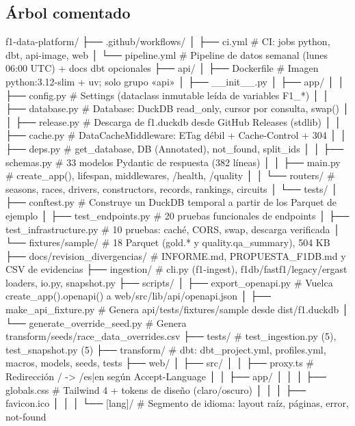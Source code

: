 \subsection{Árbol comentado}

\begin{codigo}
f1-data-platform/
├── .github/workflows/
│   ├── ci.yml                 # CI: jobs python, dbt, api-image, web
│   └── pipeline.yml           # Pipeline de datos semanal (lunes 06:00 UTC) + docs dbt opcionales
├── api/
│   ├── Dockerfile             # Imagen python:3.12-slim + uv; solo grupo «api»
│   ├── __init__.py
│   ├── app/
│   │   ├── config.py          # Settings (dataclass inmutable leída de variables F1_*)
│   │   ├── database.py        # Database: DuckDB read_only, cursor por consulta, swap()
│   │   ├── release.py         # Descarga de f1.duckdb desde GitHub Releases (stdlib)
│   │   ├── cache.py           # DataCacheMiddleware: ETag débil + Cache-Control + 304
│   │   ├── deps.py            # get_database, DB (Annotated), not_found, split_ids
│   │   ├── schemas.py         # 33 modelos Pydantic de respuesta (382 líneas)
│   │   ├── main.py            # create_app(), lifespan, middlewares, /health, /quality
│   │   └── routers/           # seasons, races, drivers, constructors, records, rankings, circuits
│   └── tests/
│       ├── conftest.py        # Construye un DuckDB temporal a partir de los Parquet de ejemplo
│       ├── test_endpoints.py  # 20 pruebas funcionales de endpoints
│       ├── test_infrastructure.py  # 10 pruebas: caché, CORS, swap, descarga verificada
│       └── fixtures/sample/   # 18 Parquet (gold.* y quality.qa_summary), 504 KB
├── docs/revision_divergencias/  # INFORME.md, PROPUESTA_F1DB.md y CSV de evidencias
├── ingestion/                 # cli.py (f1-ingest), f1db/fastf1/legacy/ergast loaders, io.py, snapshot.py
├── scripts/
│   ├── export_openapi.py      # Vuelca create_app().openapi() a web/src/lib/api/openapi.json
│   ├── make_api_fixture.py    # Genera api/tests/fixtures/sample desde dist/f1.duckdb
│   └── generate_override_seed.py  # Genera transform/seeds/race_data_overrides.csv
├── tests/                     # test_ingestion.py (5), test_snapshot.py (5)
├── transform/                 # dbt: dbt_project.yml, profiles.yml, macros, models, seeds, tests
├── web/
│   ├── src/
│   │   ├── proxy.ts           # Redirección / -> /{es|en} según Accept-Language
│   │   ├── app/
│   │   │   ├── globals.css    # Tailwind 4 + tokens de diseño (claro/oscuro)
│   │   │   ├── favicon.ico
│   │   │   └── [lang]/        # Segmento de idioma: layout raíz, páginas, error, not-found

\end{codigo}
